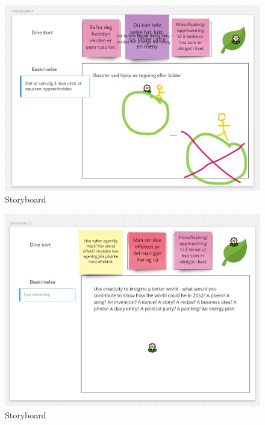 \begin{figure}[H]
    \centering 
    \includegraphics[width=12.5cm]{pictures/appendix/narrative/s4.PNG}
    \caption{Storyboard}
\end{figure}

\begin{figure}[H]
    \centering 
    \includegraphics[width=12.5cm]{pictures/appendix/narrative/s5.PNG}
    \caption{Storyboard}
\end{figure}

